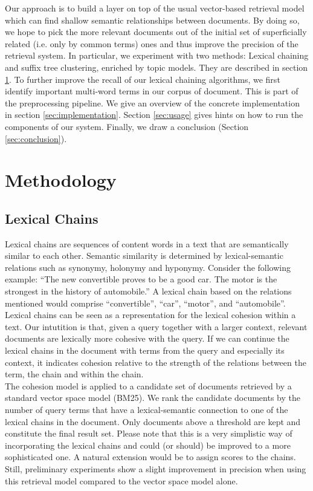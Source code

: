 \documentclass[11pt, a4paper, abstraction]{scrartcl}
\begin{document}
Our approach is to build a layer on top of the usual vector-based retrieval model which can find shallow semantic relationships between documents. By doing so, we hope to pick the more relevant documents out of the initial set of superficially related (i.e. only by common terms) ones and thus improve the precision of the retrieval system. In particular, we experiment with two methods: Lexical chaining and suffix tree clustering, enriched by topic models. They are described in section \ref{sec:methodology}. To further improve the recall of our lexical chaining algorithms, we first identify important multi-word terms in our corpus of document. This is part of the preprocessing pipeline. We give an overview of the concrete implementation in section \ref{sec:implementation}. Section \ref{sec:usage} gives hints on how to run the components of our system. Finally, we draw a conclusion (Section \ref{sec:conclusion}).    

\section{Methodology}
\label{sec:methodology}

\subsection{Lexical Chains}

Lexical chains are sequences of content words in a text that are semantically similar to each other. Semantic similarity is determined by lexical-semantic relations such as synonymy, holonymy and hyponymy. Consider the following example: ``The new convertible proves to be a good car. The motor is the strongest in the history of automobile.''
A lexical chain based on the relations mentioned would comprise ``convertible'', ``car'', ``motor'', and ``automobile''. Lexical chains can be seen as a representation for the lexical cohesion within a text. Our intutition is that, given a query together with a larger context, relevant documents are lexically more cohesive with the query. If we can continue the lexical chains in the document with terms from the query and especially its context, it indicates cohesion relative to the strength of the relations between the term, the chain and within the chain. \\
The cohesion model is applied to a candidate set of documents retrieved by a standard vector space model (BM25). We rank the candidate documents by the number of query terms that have a lexical-semantic connection to one of the lexical chains in the document. Only documents above a threshold are kept and constitute the final result set. Please note that this is a very simplistic way of incorporating the lexical chains and could (or should) be improved to a more sophisticated one. A natural extension would be to assign scores to the chains. Still, preliminary experiments show a slight improvement in precision when using this retrieval model compared to the vector space model alone.      
  
\end{document}
